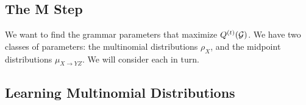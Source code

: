 



\subsection{The M Step}

We want to find the grammar parameters that maximize
$Q^{(t)}({\mathcal G})$. We have two classes of parameters: the multinomial
distributions $\rho_X$, and the midpoint distributions $\mu_{X\to
  YZ}$. We will consider each in turn.



\subsection{Learning Multinomial Distributions}
\label{sec-multinomial}

